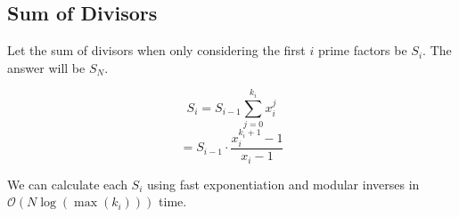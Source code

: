 \subsection{Sum of Divisors}

Let the sum of divisors when only considering the first $i$ prime factors be $S_i$. The answer will be $S_N$.

$$S_i = S_{i - 1} \sum_{j=0}^{k_{i}} x_{i}^{j}$$
$$    = S_{i - 1} \cdot \dfrac{x_{i}^{k_{i}+1} - 1}{x_{i} - 1}$$

We can calculate each $S_i$ using fast exponentiation and modular inverses in $\mathcal O(N \log(\max(k_i)))$ time.